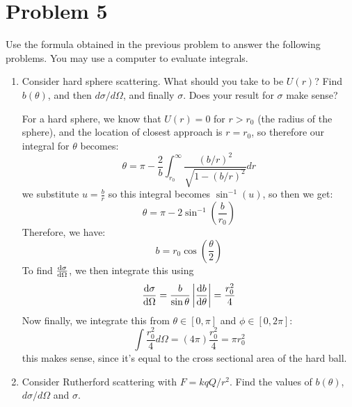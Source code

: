 \documentclass[10pt]{article}
\begin{document}
	\pagebreak


	\section*{Problem 5}
	Use the formula obtained in the previous problem to answer the following problems. You may use a computer
	to evaluate integrals.

	\begin{enumerate}[label=\alph*)]
		\item Consider hard sphere scattering. What should you take to be $U(r)$? Find $b(\theta)$, and then 
			$d\sigma/d\Omega$, and finally $\sigma$. Does your result for $\sigma$ make sense?

			\begin{solution}
				For a hard sphere, we know that $U(r) = 0$ for $r > r_0$ (the radius of the sphere), and the location of closest approach is
				$r = r_0$, so therefore our integral for $\theta$ becomes:
				\[
					\theta = \pi - \frac{2}{b}\int_{r_0}^\infty \frac{(b/r)^2}{\sqrt{1 - (b/r)^2}} dr
				\] 
				we substitute $u = \frac{b}{r}$ so this integral becomes $\sin^{-1}(u)$, so then we get:
				\[
					\theta = \pi - 2\sin^{-1}\left( \frac{b}{r_0} \right) 
				\]
				Therefore, we have: 
				\[
				b = r_0\cos\left( \frac{\theta}{2} \right) 
				\] 
				To find $\dv{\sigma}{\Omega}$, we then integrate this using 
				\[
				\dv{\sigma}{\Omega} = \frac{b}{\sin \theta} \left|\dv{b}{\theta}\right| = \frac{r_0^2}{4}
				\] 
				Now finally, we integrate this from $\theta \in [0, \pi]$ and $\phi \in [0, 2\pi]$:
				\[
				\int \frac{r_0^2}{4} d\Omega = (4\pi) \frac{r_0^2}{4} = \pi r_0^2
				\] 
				this makes sense, since it's equal to the cross sectional area of the hard ball. 
			\end{solution}
		\item Consider Rutherford scattering with $F = kqQ/r^2$. Find the values of $b(\theta)$, 
			$d\sigma/d\Omega$ and $\sigma$. 


\end{enumerate}
\end{document}
